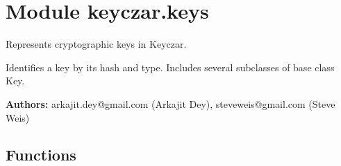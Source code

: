 %
%
%


\section{Module keyczar.keys}

    \label{keyczar:keys}
Represents cryptographic keys in Keyczar.

Identifies a key by its hash and type. Includes several subclasses of base 
class Key.

\textbf{Authors:}
arkajit.dey@gmail.com (Arkajit Dey),
    steveweis@gmail.com (Steve Weis)



  \subsection{Functions}

    \label{keyczar:keys:GenKey}

    \vspace{0.5ex}

